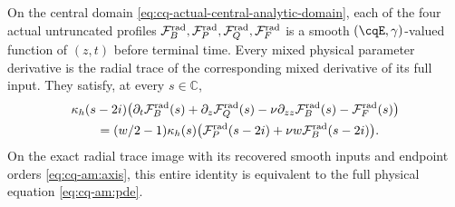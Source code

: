 \begin{cqproposition}
\label{prop:cq-radial-entire-dynamics}
On the central domain \eqref{eq:cq-actual-central-analytic-domain},
each of the four actual untruncated profiles
$\mathcal F_B^{\rm rad},\mathcal F_P^{\rm rad},
\mathcal F_Q^{\rm rad},\mathcal F_F^{\rm rad}$ is a smooth
$(\cqE,\gamma)$-valued function of $(z,t)$ before terminal time.
Every mixed physical parameter derivative is the radial trace of
the corresponding mixed derivative of its full input. They satisfy,
at every $s\in\mathbb C$,
\begin{equation}
\begin{split}
 &\kappa_h(s-2i)
  \bigl(\partial_t\mathcal F_B^{\rm rad}(s)
       +\partial_z\mathcal F_Q^{\rm rad}(s)
       -\nu\partial_{zz}\mathcal F_B^{\rm rad}(s)
       -\mathcal F_F^{\rm rad}(s)\bigr)\\
 &\qquad=(w/2-1)\kappa_h(s)
  \bigl(\mathcal F_P^{\rm rad}(s-2i)
                  +\nu w\mathcal F_B^{\rm rad}(s-2i)\bigr).
\end{split}
\label{eq:cq-radial-entire-angular-pde}
\end{equation}
On the exact radial trace image with its recovered smooth inputs
and endpoint orders \eqref{eq:cq-am:axis}, this entire identity is
equivalent to the full physical equation \eqref{eq:cq-am:pde}.
\end{cqproposition}

